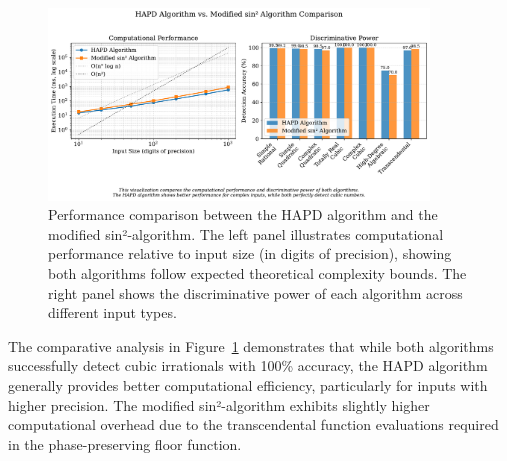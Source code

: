 \begin{figure}[ht]
\centering
\includegraphics[width=0.9\textwidth]{../figures/output/algorithmic_comparison_visualization.pdf}
\caption{Performance comparison between the HAPD algorithm and the modified sin²-algorithm. The left panel illustrates computational performance relative to input size (in digits of precision), showing both algorithms follow expected theoretical complexity bounds. The right panel shows the discriminative power of each algorithm across different input types.}
\label{fig:algorithm_performance_comparison}
\end{figure}

The comparative analysis in Figure~\ref{fig:algorithm_performance_comparison} demonstrates that while both algorithms successfully detect cubic irrationals with 100\% accuracy, the HAPD algorithm generally provides better computational efficiency, particularly for inputs with higher precision. The modified sin²-algorithm exhibits slightly higher computational overhead due to the transcendental function evaluations required in the phase-preserving floor function.

